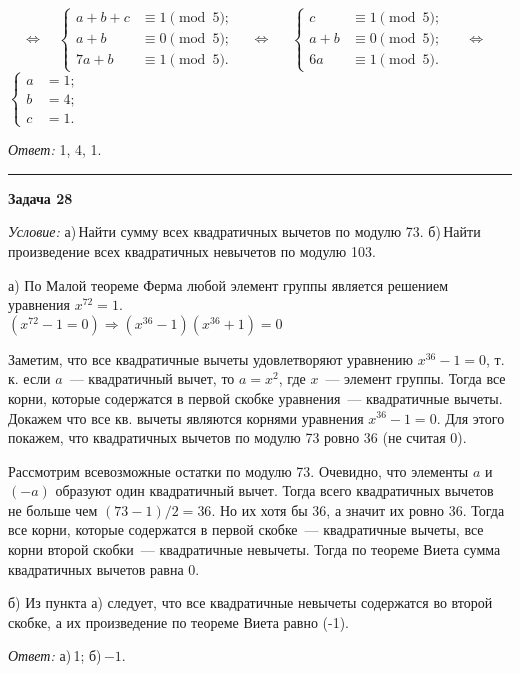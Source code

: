 \documentclass[12pt,a4paper]{article}
\newcommand{\so}{\Rightarrow}
\newcommand{\sbs}{\large \bfseries}
\newcommand{\rl}{\vspace{16pt} \hrule \vspace{8pt}}
\begin{document}
$\quad \Leftrightarrow \quad 
\left\{
\begin{aligned}
a+b+c & \equiv 1\pmod{5}; \\
a+b & \equiv 0\pmod{5}; \\
7a+b & \equiv 1\pmod{5}.
\end{aligned}
\right.
\quad \Leftrightarrow \quad $
$\left\{
\begin{aligned}
c & \equiv 1\pmod{5}; \\
a+b & \equiv 0\pmod{5}; \\
6a & \equiv 1\pmod{5}.
\end{aligned}
\right.$
$\quad \Leftrightarrow \quad $
$\left\{
\begin{aligned}
a &= 1; \\
b &=4; \\
c &=1.
\end{aligned}
\right.$

{\itshape Ответ: } 1, 4, 1.




\rl
{\sbs Задача 28}

{\itshape Условие: } а)\,Найти сумму всех квадратичных вычетов по модулю 73. б)\,Найти произведение всех квадратичных невычетов по модулю 103.

а) По Малой теореме Ферма любой элемент группы является решением уравнения $x^{72} = 1$.\\
$(x^{72} - 1 = 0) \so (x^{36} - 1)(x^{36} + 1) = 0$

Заметим, что все квадратичные вычеты удовлетворяют уравнению $x^{36} - 1 = 0$, т.\,к. если $a$~--- квадратичный вычет, то $a = x^2$, где $x$~--- элемент группы. Тогда все корни, которые содержатся в первой скобке уравнения~--- квадратичные вычеты. Докажем что все кв. вычеты являются корнями уравнения $x^{36} - 1 = 0$. Для этого покажем, что квадратичных вычетов по модулю 73 ровно 36 (не считая 0).

Рассмотрим всевозможные остатки по модулю 73. Очевидно, что элементы $a$ и $(-a)$ образуют один квадратичный вычет. Тогда всего квадратичных вычетов не больше чем $(73 - 1)/2 = 36$. Но их хотя бы 36, а значит их ровно 36. Тогда все корни, которые содержатся в первой скобке~--- квадратичные вычеты, все корни второй скобки~--- квадратичные невычеты. Тогда по теореме Виета сумма квадратичных вычетов равна 0.

б) Из пункта а) следует, что все квадратичные невычеты содержатся во второй скобке, а их произведение по теореме Виета равно (-1).

{\itshape Ответ: } а)\,1; б)\,$-1$.
\end{document}
